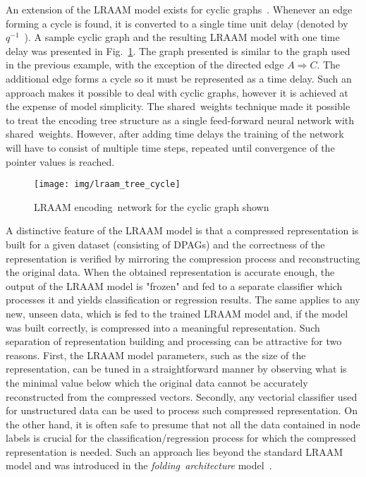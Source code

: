 An extension of the LRAAM model exists for cyclic graphs~\cite{goulon2005hopfield}. Whenever an edge forming a cycle is found, it is converted to a single time unit delay (denoted by $q^{-1}$~\cite{frasconi1998general}). A sample cyclic graph and the resulting LRAAM model with one time delay was presented in Fig.~\ref{fig:lraam_tree_cycle}. The graph presented is similar to the graph used in the previous example, with the exception of the directed edge $A \Rightarrow C$. The additional edge forms a cycle so it must be represented as a time delay. Such an approach makes it possible to deal with cyclic graphs, however it is achieved at the expense of model simplicity. The shared~weights technique made it possible to treat the encoding tree structure as a single feed-forward neural network with shared~weights. However, after adding time delays the training of the network will have to consist of multiple time steps, repeated until convergence of the pointer values is reached.

\begin{figure}
\begin{center}
	\texttt{[image: img/lraam\_tree\_cycle]}
	\caption{LRAAM encoding~network for the cyclic graph shown}
	\label{fig:lraam_tree_cycle}
\end{center}
\end{figure}

A distinctive feature of the LRAAM model is that a compressed representation is built for a given dataset (consisting of DPAGs) and the correctness of the representation is verified by mirroring the compression process and reconstructing the original data. When the obtained representation is accurate enough, the output of the LRAAM model is "frozen" and fed to a separate classifier which processes it and yields classification or regression results. The same applies to any new, unseen data, which is fed to the trained LRAAM model and, if the model was built correctly, is compressed into a meaningful representation. Such separation of representation building and processing can be attractive for two reasons. First, the LRAAM model parameters, such as the size of the representation, can be tuned in a straightforward manner by observing what is the minimal value below which the original data cannot be accurately reconstructed from the compressed vectors. Secondly, any vectorial classifier used for unstructured data can be used to process such compressed representation. On the other hand, it is often safe to presume that not all the data contained in node labels is crucial for the classification/regression process for which the compressed representation is needed. Such an approach lies beyond the standard LRAAM model and was introduced in the \emph{folding~architecture} model~\cite{kuchler1996inductive}.


